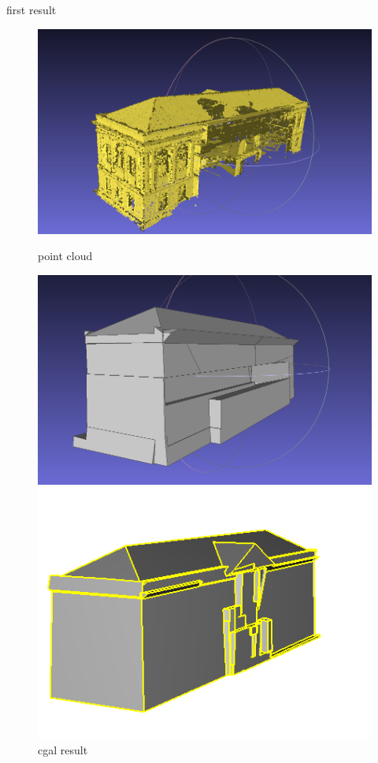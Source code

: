 \documentclass[10pt]{beamer}
\begin{document}
\begin{frame}{first result}
\begin{figure}[H]
    \centering
    \begin{minipage}[t]{0.35\textwidth}
    \includegraphics[width=\textwidth]{../../images/screen_kinetic/building_point.png}
    \caption*{point cloud}
\end{minipage}
    \begin{minipage}[t]{0.335\textwidth}
    \includegraphics[width=\textwidth]{../../images/screen_kinetic/building_cgal.png}
    \caption*{cgal result}
\end{minipage}
    \begin{minipage}[t]{0.35\textwidth}
    \includegraphics[width=\textwidth]{../../images/screen_kinetic/building_inria.png}

\end{minipage}
\end{figure}
\end{frame}
\end{document}
